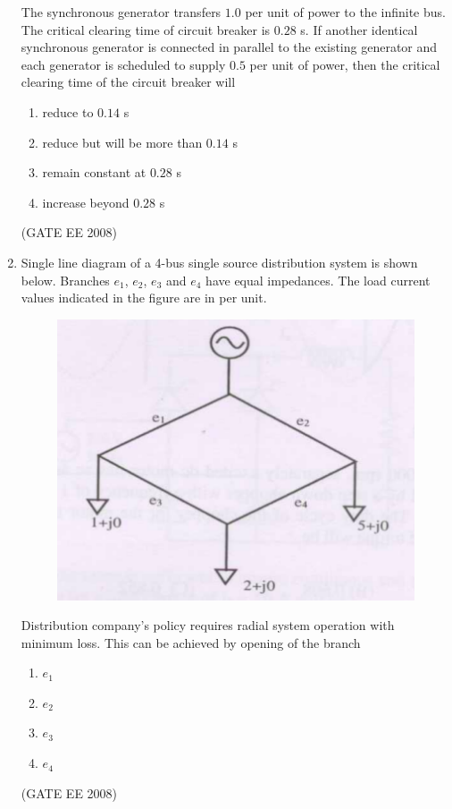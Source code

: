 \documentclass[journal,12pt,onecolumn]{IEEEtran}
\theoremstyle{remark}
\begin{document}
\begin{enumerate}[start=1, label=Q.\arabic*]
The synchronous generator transfers $1.0$ per unit of power to the infinite bus. The critical clearing time of circuit breaker is $0.28$ s. If another identical synchronous generator is connected in parallel to the existing generator and each generator is scheduled to supply $0.5$ per unit of power, then the critical clearing time of the circuit breaker will

\begin{enumerate}
    \item reduce to $0.14$ s
    \item reduce but will be more than $0.14$ s
    \item remain constant at $0.28$ s
    \item increase beyond $0.28$ s
\end{enumerate}
\hfill (GATE EE 2008)


\item Single line diagram of a 4-bus single source distribution system is shown below. Branches $e_1$, $e_2$, $e_3$ and $e_4$ have equal impedances. The load current values indicated in the figure are in per unit.

\begin{figure}[H]
    \centering
    \includegraphics[width=\columnwidth]{Fig/q54.png}
\end{figure}

Distribution company's policy requires radial system operation with minimum loss. This can be achieved by opening of the branch

\begin{multicols}{4}
\begin{enumerate}
    \item $e_1$
    \item $e_2$
    \item $e_3$
    \item $e_4$
\end{enumerate}
\end{multicols}
\hfill (GATE EE 2008)




\end{enumerate}
\end{document}
